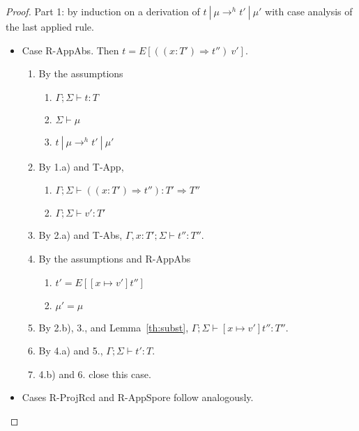 \documentclass{article}
\theoremstyle{definition}
\begin{document}
\begin{proof}

Part 1: by induction on a derivation of $t~|~\mu \rightarrow^h t'~|~\mu'$ with case analysis of the last applied rule.

\begin{itemize}
\item Case R-AppAbs. Then $t = E[((x : T') \Rightarrow t'')~v']$.
\begin{enumerate}
\item By the assumptions
  \begin{enumerate}[label=(\alph*)]
  \item $\Gamma ; \Sigma \vdash t : T$
  \item $\Sigma \vdash \mu$
  \item $t~|~\mu \rightarrow^h t'~|~\mu'$
  \end{enumerate}
\item By 1.a) and T-App,
  \begin{enumerate}[label=(\alph*)]
  \item $\Gamma ; \Sigma \vdash ((x : T') \Rightarrow t'') : T' \Rightarrow T''$
  \item $\Gamma ; \Sigma \vdash v' : T'$
  \end{enumerate}
\item By 2.a) and T-Abs, $\Gamma , x : T' ; \Sigma \vdash t'' : T''$.
\item By the assumptions and R-AppAbs
  \begin{enumerate}[label=(\alph*)]
  \item $t' = E[[x \mapsto v']t'']$
  \item $\mu' = \mu$
  \end{enumerate}
\item By 2.b), 3., and Lemma~\ref{th:subst}, $\Gamma ; \Sigma \vdash [x \mapsto v']t'' : T''$.
\item By 4.a) and 5., $\Gamma ; \Sigma \vdash t' : T$.
\item 4.b) and 6. close this case.
\end{enumerate}

\item Cases R-ProjRcd and R-AppSpore follow analogously.


\end{itemize}
\end{proof}
\end{document}
